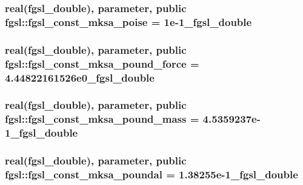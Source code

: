 \subsubsection[{fgsl\+\_\+const\+\_\+mksa\+\_\+poise}]{\setlength{\rightskip}{0pt plus 5cm}real({\bf fgsl\+\_\+double}), parameter, public fgsl\+::fgsl\+\_\+const\+\_\+mksa\+\_\+poise = 1e-\/1\+\_\+fgsl\+\_\+double}\label{namespacefgsl_a1b18b9e73da6e94185746f50a31ca4c3}
\hypertarget{namespacefgsl_af568f44c87cf706dcc1fe887c5a68604}{}
\subsubsection[{fgsl\+\_\+const\+\_\+mksa\+\_\+pound\+\_\+force}]{\setlength{\rightskip}{0pt plus 5cm}real({\bf fgsl\+\_\+double}), parameter, public fgsl\+::fgsl\+\_\+const\+\_\+mksa\+\_\+pound\+\_\+force = 4.\+44822161526e0\+\_\+fgsl\+\_\+double}\label{namespacefgsl_af568f44c87cf706dcc1fe887c5a68604}
\hypertarget{namespacefgsl_ad3cb7ad76502d5665ed74c2306e2b5f2}{}
\subsubsection[{fgsl\+\_\+const\+\_\+mksa\+\_\+pound\+\_\+mass}]{\setlength{\rightskip}{0pt plus 5cm}real({\bf fgsl\+\_\+double}), parameter, public fgsl\+::fgsl\+\_\+const\+\_\+mksa\+\_\+pound\+\_\+mass = 4.\+5359237e-\/1\+\_\+fgsl\+\_\+double}\label{namespacefgsl_ad3cb7ad76502d5665ed74c2306e2b5f2}
\hypertarget{namespacefgsl_a6679d0f4bba1852ff847f920c8f8ad2b}{}
\subsubsection[{fgsl\+\_\+const\+\_\+mksa\+\_\+poundal}]{\setlength{\rightskip}{0pt plus 5cm}real({\bf fgsl\+\_\+double}), parameter, public fgsl\+::fgsl\+\_\+const\+\_\+mksa\+\_\+poundal = 1.\+38255e-\/1\+\_\+fgsl\+\_\+double}\label{namespacefgsl_a6679d0f4bba1852ff847f920c8f8ad2b}
\hypertarget{namespacefgsl_a11b01d727e4e01028200e21ced0e16c2}{}
